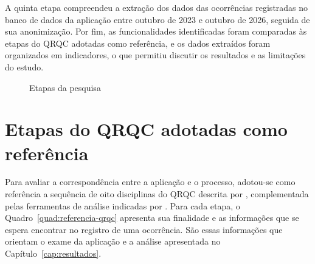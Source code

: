 A quinta etapa compreendeu a extração dos dados das ocorrências registradas no banco de dados da aplicação entre outubro de 2023 e outubro de 2026, seguida de sua anonimização. Por fim, as funcionalidades identificadas foram comparadas às etapas do QRQC adotadas como referência, e os dados extraídos foram organizados em indicadores, o que permitiu discutir os resultados e as limitações do estudo.

\begin{figure}[htb]
    \centering
    \caption{Etapas da pesquisa}
    \label{fig:etapas-pesquisa}
\end{figure}

\section{Etapas do QRQC adotadas como referência}
\label{sec:referencia-qrqc}

Para avaliar a correspondência entre a aplicação e o processo, adotou-se como referência a sequência de oito disciplinas do QRQC descrita por , complementada pelas ferramentas de análise indicadas por . Para cada etapa, o Quadro~\ref{quad:referencia-qrqc} apresenta sua finalidade e as informações que se espera encontrar no registro de uma ocorrência. São essas informações que orientam o exame da aplicação e a análise apresentada no Capítulo~\ref{cap:resultados}.

